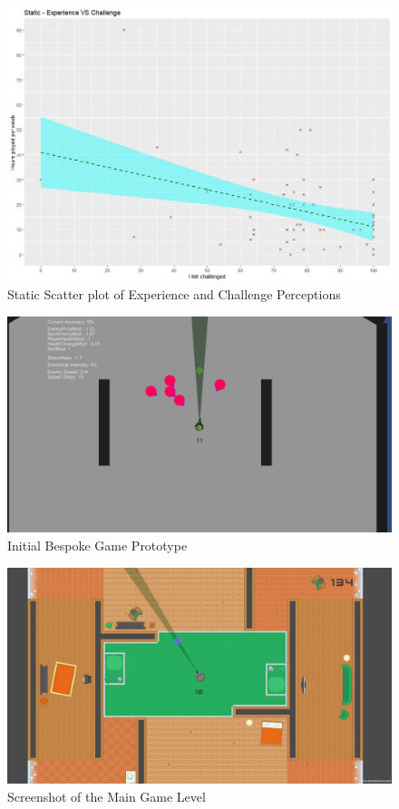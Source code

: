 \documentclass[journal]{IEEEtran}
\begin{document}
\begin{figure}[h]
	\includegraphics[width=0.75\linewidth]{staticexpvschallenge.jpg}
	\caption{Static Scatter plot of Experience and Challenge Perceptions}
	\label{Analysis Test}
\end{figure}

\begin{figure}[h]
	\includegraphics[width=0.75\linewidth]{secondprototype.jpg}
	\caption{Initial Bespoke Game Prototype}
	\label{Analysis Test}
\end{figure} 

\begin{figure}[h]
	\includegraphics[width=0.75\linewidth]{maingame.jpg}
	\caption{Screenshot of the Main Game Level}
	\label{Analysis Test}
\end{figure} 
\end{document}
